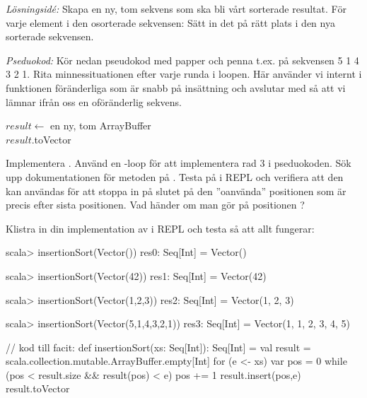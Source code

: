 \emph{Lösningsidé:} Skapa en ny, tom sekvens som ska bli vårt sorterade resultat. För varje element i den osorterade sekvensen: Sätt in det på rätt plats i den nya sorterade sekvensen.   

\Subtask \emph{Pseduokod:} Kör nedan pseudokod med papper och penna t.ex. på sekvensen 5 1 4 3 2 1. Rita minnessituationen efter varje runda i loopen. Här använder vi internt i funktionen föränderliga  som är snabb på insättning och avslutar med  så att vi lämnar ifrån oss en oföränderlig sekvens.

\begin{algorithm}[H]
    $result \leftarrow$ en ny, tom ArrayBuffer \\
    $result$.toVector
\end{algorithm}


\Subtask Implementera . Använd en -loop för att implementera rad 3 i pseduokoden. Sök upp dokumentationen för metoden  på . Testa   på  i REPL och verifiera att den kan användas för att stoppa in på slutet på den ''oanvända'' positionen som är precis efter sista positionen. Vad händer om man gör  på positionen ? 

Klistra in din implementation av  i REPL och testa så att allt fungerar:
\begin{REPL}
scala> insertionSort(Vector())
res0: Seq[Int] = Vector()

scala> insertionSort(Vector(42))
res1: Seq[Int] = Vector(42)

scala> insertionSort(Vector(1,2,3))
res2: Seq[Int] = Vector(1, 2, 3)

scala> insertionSort(Vector(5,1,4,3,2,1))
res3: Seq[Int] = Vector(1, 1, 2, 3, 4, 5)
\end{REPL}


\begin{Code}[numbers=left]
// kod till facit:
def insertionSort(xs: Seq[Int]): Seq[Int] = {
  val result = scala.collection.mutable.ArrayBuffer.empty[Int]
  for (e <- xs) {
    var pos = 0
    while (pos < result.size && result(pos) < e) pos += 1
    result.insert(pos,e)
  }
  result.toVector
}
\end{Code}





